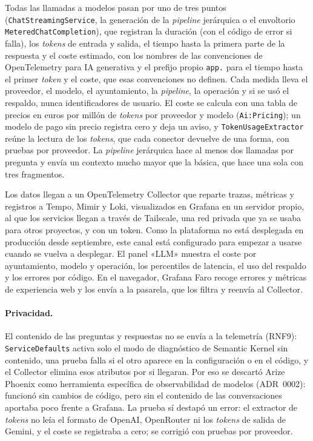 Todas las llamadas a modelos pasan por uno de tres puntos (\texttt{ChatStreamingService}, la generación de la \emph{pipeline} jerárquica o el envoltorio \texttt{MeteredChatCompletion}), que registran la duración (con el código de error si falla), los \emph{tokens} de entrada y salida, el tiempo hasta la primera parte de la respuesta y el coste estimado, con los nombres de las convenciones de OpenTelemetry para IA generativa \cite{otelgenai} y el prefijo propio \texttt{app.} para el tiempo hasta el primer \emph{token} y el coste, que esas convenciones no definen. Cada medida lleva el proveedor, el modelo, el ayuntamiento, la \emph{pipeline}, la operación y si se usó el respaldo, nunca identificadores de usuario. El coste se calcula con una tabla de precios en euros por millón de \emph{tokens} por proveedor y modelo (\texttt{Ai:Pricing}); un modelo de pago sin precio registra cero y deja un aviso, y \texttt{TokenUsageExtractor} reúne la lectura de los \emph{tokens}, que cada conector devuelve de una forma, con pruebas por proveedor. La \emph{pipeline} jerárquica hace al menos dos llamadas por pregunta y envía un contexto mucho mayor que la básica, que hace una sola con tres fragmentos.

Los datos llegan a un OpenTelemetry Collector que reparte trazas, métricas y registros a Tempo, Mimir y Loki, visualizados en Grafana en un servidor propio, al que los servicios llegan a través de Tailscale, una red privada que ya se usaba para otros proyectos, y con un token. Como la plataforma no está desplegada en producción desde septiembre, este canal está configurado para empezar a usarse cuando se vuelva a desplegar. El panel «LLM» muestra el coste por ayuntamiento, modelo y operación, los percentiles de latencia, el uso del respaldo y los errores por código. En el navegador, Grafana Faro recoge errores y métricas de experiencia web y los envía a la pasarela, que los filtra y reenvía al Collector.

\paragraph{Privacidad.} El contenido de las preguntas y respuestas no se envía a la telemetría (RNF9): \texttt{ServiceDefaults} activa solo el modo de diagnóstico de Semantic Kernel sin contenido, una prueba falla si el otro aparece en la configuración o en el código, y el Collector elimina esos atributos por si llegaran. Por eso se descartó Arize Phoenix \cite{arizephoenix} como herramienta específica de observabilidad de modelos (ADR~0002): funcionó sin cambios de código, pero sin el contenido de las conversaciones aportaba poco frente a Grafana. La prueba sí destapó un error: el extractor de \emph{tokens} no leía el formato de OpenAI, OpenRouter ni los \emph{tokens} de salida de Gemini, y el coste se registraba a cero; se corrigió con pruebas por proveedor.

